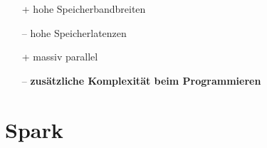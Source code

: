 \begin{frame}
\begin{itemize}
        \item[+] hohe Speicherbandbreiten
        \item[–] hohe Speicherlatenzen
        \item[+] massiv parallel %
        \item[–] \textbf{zusätzliche Komplexität beim Programmieren}
    \end{itemize}
\end{frame}



\section{Spark}


